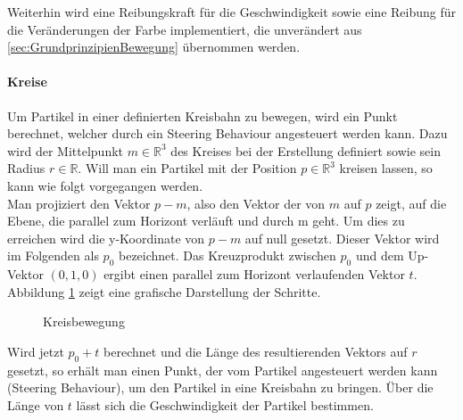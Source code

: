 \documentclass[11pt,a4paper]{article}
\begin{document}
\noindent
Weiterhin wird eine Reibungskraft für die Geschwindigkeit sowie eine Reibung für die Veränderungen der Farbe implementiert, die unverändert aus \ref{sec:GrundprinzipienBewegung} übernommen werden.

\paragraph{Kreise}
Um Partikel in einer definierten Kreisbahn zu bewegen, wird ein Punkt berechnet, welcher durch ein Steering Behaviour angesteuert werden kann.
Dazu wird der Mittelpunkt $m \in \mathbb{R}^3$ des Kreises bei der Erstellung definiert sowie sein Radius $r \in \mathbb{R}$. Will man ein Partikel mit der Position $p \in \mathbb{R}^3$ kreisen lassen, so kann wie folgt vorgegangen werden.\\
Man projiziert den Vektor $p - m$, also den Vektor der von $m$ auf $p$ zeigt, auf die Ebene, die parallel zum Horizont verläuft und durch m geht. Um dies zu erreichen wird die y-Koordinate von $p - m$ auf null gesetzt. Dieser Vektor wird im Folgenden als $p_0$ bezeichnet. Das Kreuzprodukt zwischen $p_0$ und dem Up-Vektor $(0, 1, 0)$ ergibt einen parallel zum Horizont verlaufenden Vektor $t$. Abbildung \ref{fig:kreisberechnung} zeigt eine grafische Darstellung der Schritte.
\begin{center}
\begin{figure}[!ht]
\centering
\vspace{20pt}
\caption[Kreisbewegung]{Kreisbewegung}
\label{fig:kreisberechnung}
\end{figure}
\end{center}
\noindent
Wird jetzt $p_0+t$ berechnet und die Länge des resultierenden Vektors auf $r$ gesetzt, so erhält man einen Punkt, der vom Partikel angesteuert werden kann (Steering Behaviour), um den Partikel in eine Kreisbahn zu bringen. Über die Länge von $t$ lässt sich die Geschwindigkeit der Partikel bestimmen.
\end{document}
